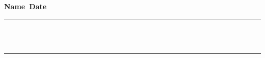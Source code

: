 \documentclass[10pt,landscape,letterpaper]{article}
\begin{document}
{\bf Name\ \underline{\hskip 200pt}\hskip 200pt}{\bf Date\
\underline{\hskip 150pt}}

\vskip 1cm

{
\vskip 10pt
\rule[1.75ex]{10in}{1pt}
\\
\hdashrule{10.25in}{1pt}{4mm}
\\
\rule[-1.75ex]{10in}{1pt}
\\[2mm]
}

%
\end{document}
